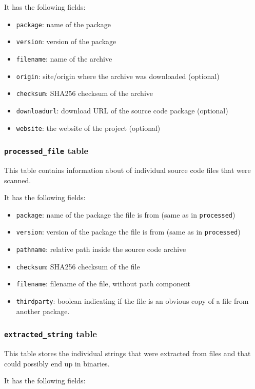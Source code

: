 \documentclass[10pt,a4paper]{article}
\begin{document}
It has the following fields:

\begin{itemize}
\item \texttt{package}: name of the package
\item \texttt{version}: version of the package
\item \texttt{filename}: name of the archive
\item \texttt{origin}: site/origin where the archive was downloaded (optional)
\item \texttt{checksum}: SHA256 checksum of the archive
\item \texttt{downloadurl}: download URL of the source code package (optional)
\item \texttt{website}: the website of the project (optional)
\end{itemize}

\subsubsection{\texttt{processed\_file} table}
This table contains information about of individual source code files that were
scanned.

It has the following fields:

\begin{itemize}
\item \texttt{package}: name of the package the file is from (same as in
\texttt{processed})
\item \texttt{version}: version of the package the file is from (same as in
\texttt{processed})
\item \texttt{pathname}: relative path inside the source code archive
\item \texttt{checksum}: SHA256 checksum of the file
\item \texttt{filename}: filename of the file, without path component
\item \texttt{thirdparty}: boolean
indicating if the file is an obvious copy of a file from another package.
\end{itemize}

\subsubsection{\texttt{extracted\_string} table}
This table stores the individual strings that were extracted from files and
that could possibly end up in binaries.

It has the following fields:
\end{document}
